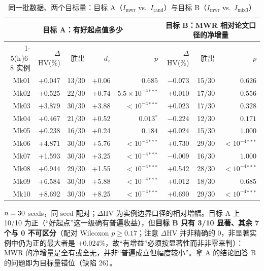 \begin{table}[htbp]
  \centering
  \caption{同一批数据、两个目标量：目标 A（$I_{\mathrm{mwr}}$ vs.\ $I_{\mathrm{rand}}$）与目标 B（$I_{\mathrm{mwr}}$ vs.\ $I_{\mathrm{mix3}}$）}
  \label{tab:targets}
  \footnotesize
  \begin{tabular}{rrrrrrrr}
    \toprule
    \multicolumn{5}{c}{\textbf{目标 A：有好起点值多少}} & \multicolumn{3}{c}{\textbf{目标 B：MWR 相对论文口径的净增量}} \\
    \cmidrule(lr){1-5}\cmidrule(lr){6-8}
    实例 & $\Delta$HV(\%) & 胜出 & $d_z$ & $p$ & $\Delta$HV(\%) & 胜出 & $p$ \\
    \midrule
    Mk01 & +0.047 & 13/30 & +0.06 & $0.685$ & −0.073 & 15/30 & $0.626$ \\
    Mk02 & +0.525 & 22/30 & +0.74 & $5.5\times 10^{-4}{}^{***}$ & +0.010 & 17/30 & $0.556$ \\
    Mk03 & +3.879 & 30/30 & +3.88 & $<10^{-4}{}^{***}$ & +0.023 & 17/30 & $0.328$ \\
    Mk04 & +0.467 & 21/30 & +0.52 & $0.013{}^{*}$ & −0.224 & 12/30 & $0.171$ \\
    Mk05 & +0.238 & 16/30 & +0.24 & $0.184$ & +0.024 & 15/30 & $1.000$ \\
    Mk06 & +4.871 & 30/30 & +5.76 & $<10^{-4}{}^{***}$ & +0.730 & 29/30 & $<10^{-4}{}^{***}$ \\
    Mk07 & +1.593 & 30/30 & +3.25 & $<10^{-4}{}^{***}$ & −0.009 & 16/30 & $1.000$ \\
    Mk08 & +0.944 & 29/30 & +1.55 & $<10^{-4}{}^{***}$ & +0.542 & 28/30 & $<10^{-4}{}^{***}$ \\
    Mk09 & +6.584 & 30/30 & +5.88 & $<10^{-4}{}^{***}$ & +0.012 & 18/30 & $0.685$ \\
    Mk10 & +8.692 & 30/30 & +8.25 & $<10^{-4}{}^{***}$ & +0.690 & 29/30 & $<10^{-4}{}^{***}$ \\
    \bottomrule
  \end{tabular}
  \par\vspace{3pt}\footnotesize\begin{minipage}{\linewidth}$n=30$ seeds，同 seed 配对；$\Delta$HV 为实例边界口径的相对增幅。目标 A 上 10/10 为正（“好起点”这一级确有普遍收益），但\textbf{目标 B 只有 3/10 显著、其余 7 个与 0 不可区分}（配对 Wilcoxon $p\ge0.17$；注意 $\Delta$HV 并非精确的 0，非显著实例中仍为正的最大者是 $+0.024\%$，故“有增益”必须按显著性而非非零来判）：MWR 的净增量是全有或全无，并非“普遍成立但幅度较小”。拿 A 的结论回答 B 的问题即为目标量错位（缺陷 26）。\end{minipage}
\end{table}
